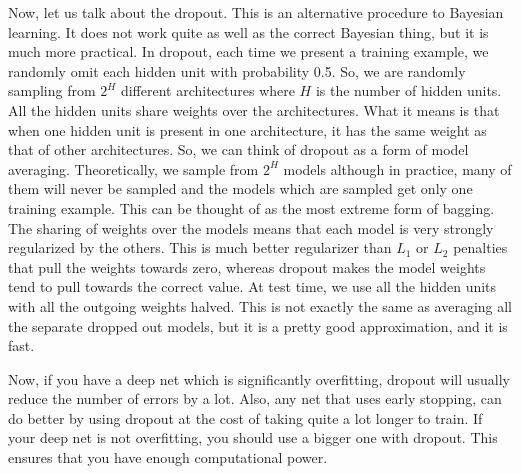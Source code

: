 \documentclass{article}
\begin{document}
Now, let us talk about the dropout. This is an alternative procedure to Bayesian learning. It does not work quite as well as the correct Bayesian thing, but it is much more practical. In dropout, each time we present a training example, we randomly omit each hidden unit with probability 0.5. So, we are randomly sampling from $2^H$ different architectures where $H$ is the number of hidden units. All the hidden units share weights over the architectures. What it means is that when one hidden unit is present in one architecture, it has the same weight as that of other architectures. So, we can think of dropout as a form of model averaging. Theoretically, we sample from $2^H$ models although in practice, many of them will never be sampled and the models which are sampled get only one training example. This can be thought of as the most extreme form of bagging. The sharing of weights over the models means that each model is very strongly regularized by the others. This is much better regularizer than $L_1$ or $L_2$ penalties that pull the weights towards zero, whereas dropout makes the model weights tend to pull towards the correct value. At test time, we use all the hidden units with all the outgoing weights halved. This is not exactly the same as averaging all the separate dropped out models, but it is a pretty good approximation, and it is fast. 

\par Now, if you have a deep net which is significantly overfitting, dropout will usually reduce the number of errors by a lot. Also, any net that uses early stopping, can do better by using dropout at the cost of taking quite a lot longer to train. If your deep net is not overfitting, you should use a bigger one with dropout. This ensures that you have enough computational power. 
\end{document}
